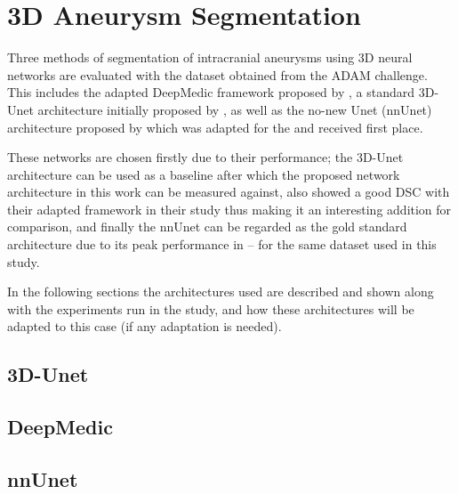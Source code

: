 \chapter{3D Aneurysm Segmentation}
\label{chapter4}
Three methods of segmentation of intracranial aneurysms using 3D neural networks are evaluated with the dataset obtained from the ADAM challenge. This includes the adapted DeepMedic framework proposed by \citeauthor{Sichermann2019}, a standard 3D-Unet architecture initially proposed by \citeauthor{3dunet}, as well as the no-new Unet (nnUnet) architecture proposed by \citeauthor{nnUnet} which was adapted for the  and received first place. 

These networks are chosen firstly due to their performance; the 3D-Unet architecture can be used as a baseline after which the proposed network architecture in this work can be measured against, \citeauthor{Sichermann2019} also showed a good DSC with their adapted framework in their study thus making it an interesting addition for comparison, and finally the nnUnet can be regarded as the gold standard architecture due to its peak performance in  -- for the same dataset used in this study.

In the following sections the architectures used are described and shown along with the experiments run in the study, and how these architectures will be adapted to this case (if any adaptation is needed). 

\section{3D-Unet}


\section{DeepMedic}

\section{nnUnet}


